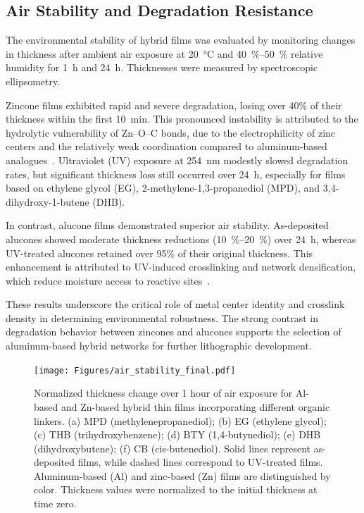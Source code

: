 \subsection{Air Stability and Degradation Resistance}

The environmental stability of hybrid films was evaluated by monitoring changes in thickness after ambient air exposure at \SI{20}{\celsius} and \SIrange{40}{50}{\percent} relative humidity for \SI{1}{\hour} and \SI{24}{\hour}. Thicknesses were measured by spectroscopic ellipsometry.

Zincone films exhibited rapid and severe degradation, losing over 40\% of their thickness within the first \SI{10}{\minute}. This pronounced instability is attributed to the hydrolytic vulnerability of Zn--O--C bonds, due to the electrophilicity of zinc centers and the relatively weak coordination compared to aluminum-based analogues~\cite{Nguyen2023}. Ultraviolet (UV) exposure at \SI{254}{\nano\meter} modestly slowed degradation rates, but significant thickness loss still occurred over \SI{24}{\hour}, especially for films based on ethylene glycol (EG), 2-methylene-1,3-propanediol (MPD), and 3,4-dihydroxy-1-butene (DHB).

In contrast, alucone films demonstrated superior air stability. As-deposited alucones showed moderate thickness reductions (\SIrange{10}{20}{\percent}) over \SI{24}{\hour}, whereas UV-treated alucones retained over 95\% of their original thickness. This enhancement is attributed to UV-induced crosslinking and network densification, which reduce moisture access to reactive sites~\cite{Park2025}.

These results underscore the critical role of metal center identity and crosslink density in determining environmental robustness. The strong contrast in degradation behavior between zincones and alucones supports the selection of aluminum-based hybrid networks for further lithographic development.

\begin{figure}[H]
  \centering
  \texttt{[image: Figures/air\_stability\_final.pdf]}
  \caption{\small
    Normalized thickness change over 1 hour of air exposure for Al-based and Zn-based hybrid thin films incorporating different organic linkers. (a) MPD (methylenepropanediol); (b) EG (ethylene glycol); (c) THB (trihydroxybenzene); (d) BTY (1,4-butynediol); (e) DHB (dihydroxybutene); (f) CB (cis-butenediol).
    Solid lines represent as-deposited films, while dashed lines correspond to UV-treated films. Aluminum-based (Al) and zinc-based (Zn) films are distinguished by color. Thickness values were normalized to the initial thickness at time zero.
  }
  \label{fig:air_stability}
\end{figure}

